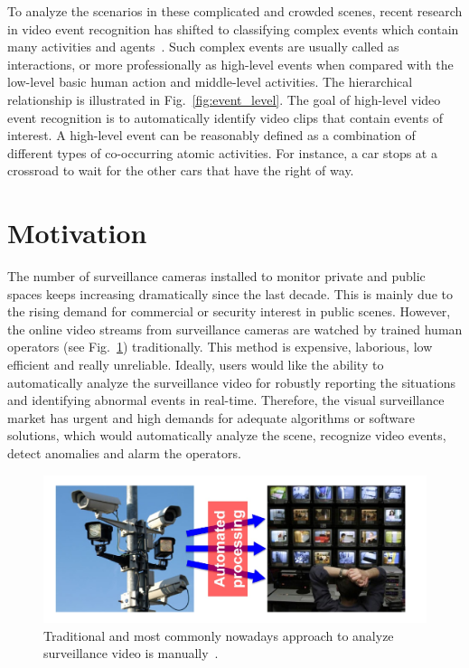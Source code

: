 To analyze the scenarios in these complicated and crowded scenes, recent research in video event recognition has shifted to classifying complex events which contain many activities and agents~\cite{swears2014complex, kinoshita2014traffic, wang2009unsupervised}. Such complex events are usually called as interactions, or more professionally as high-level events when compared with the low-level basic human action and middle-level activities. The hierarchical relationship is illustrated in Fig.~\ref{fig:event_level}. The goal of high-level video event recognition is to automatically identify video clips that contain events of interest. A high-level event can be reasonably defined as a combination of different types of co-occurring atomic activities. For instance, a car stops at a crossroad to wait for the other cars that have the right of way.

\section{Motivation}
\label{motivation}
The number of surveillance cameras installed to monitor private and public spaces keeps increasing dramatically since the last decade. 
This is mainly due to the rising demand for commercial or security interest in public scenes. However, the online video streams from surveillance cameras are watched by trained human operators (see Fig.~\ref{fig:manual_watch}) traditionally. 
This method is expensive, laborious, low efficient and really unreliable.
Ideally, users would like the ability to automatically analyze the surveillance video for robustly reporting the situations and identifying abnormal events in real-time.
Therefore, the visual surveillance market has urgent and high demands for adequate algorithms or software solutions, which would automatically analyze the scene, recognize video events, detect anomalies and alarm the operators.

\begin{figure}[!htbp]
	\centering
	\includegraphics[width = 0.8 \textwidth]{figures/human_watched.jpg}
	\caption[Surveillance video are watched by human operators]
	{Traditional and most commonly nowadays approach to analyze surveillance video is manually~\cite{nater2012abnormal}.}
	\label{fig:manual_watch}
\end{figure}

